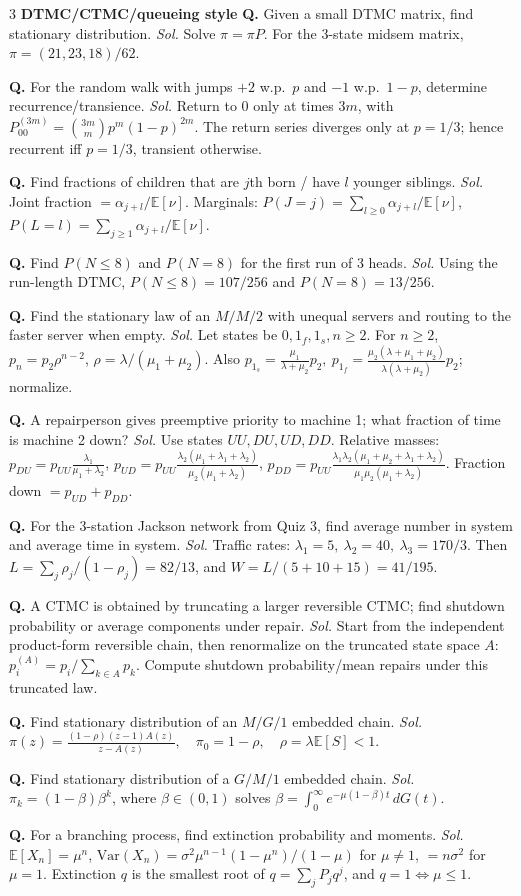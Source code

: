 \documentclass[a4paper,8pt,fleqn]{extarticle}
\newcommand{\E}{\mathbb{E}}
\newcommand{\Var}{\mathrm{Var}}
\newcommand{\1}{\mathbf{1}}
\newcommand{\sub}[1]{\textbf{#1} }
\newcommand{\probq}[2]{\textbf{Q.} #1 \emph{Sol.} #2\par}
\begin{document}
\begin{multicols}{3}
\sub{DTMC/CTMC/queueing style}
\probq{Given a small DTMC matrix, find stationary distribution.}{Solve \(\pi=\pi P\). For the 3-state midsem matrix, \(\pi=(21,23,18)/62\).}
\probq{For the random walk with jumps \(+2\) w.p.\ \(p\) and \(-1\) w.p.\ \(1-p\), determine recurrence/transience.}{Return to \(0\) only at times \(3m\), with \(P_{00}^{(3m)}=\binom{3m}{m}p^m(1-p)^{2m}\). The return series diverges only at \(p=1/3\); hence recurrent iff \(p=1/3\), transient otherwise.}
\probq{Find fractions of children that are \(j\)th born / have \(l\) younger siblings.}{Joint fraction \(=\alpha_{j+l}/\E[\nu]\). Marginals: \(P(J=j)=\sum_{l\ge0}\alpha_{j+l}/\E[\nu]\), \(P(L=l)=\sum_{j\ge1}\alpha_{j+l}/\E[\nu]\).}
\probq{Find \(P(N\le 8)\) and \(P(N=8)\) for the first run of 3 heads.}{Using the run-length DTMC, \(P(N\le8)=107/256\) and \(P(N=8)=13/256\).}
\probq{Find the stationary law of an \(M/M/2\) with unequal servers and routing to the faster server when empty.}{Let states be \(0,1_f,1_s,n\ge2\). For \(n\ge2\), \(p_n=p_2\rho^{n-2}\), \(\rho=\lambda/(\mu_1+\mu_2)\). Also \(p_{1_s}=\frac{\mu_1}{\lambda+\mu_2}p_2,\ p_{1_f}=\frac{\mu_2(\lambda+\mu_1+\mu_2)}{\lambda(\lambda+\mu_2)}p_2\); normalize.}
\probq{A repairperson gives preemptive priority to machine 1; what fraction of time is machine 2 down?}{Use states \(UU,DU,UD,DD\). Relative masses: \(p_{DU}=p_{UU}\frac{\lambda_1}{\mu_1+\lambda_2}\), \(p_{UD}=p_{UU}\frac{\lambda_2(\mu_1+\lambda_1+\lambda_2)}{\mu_2(\mu_1+\lambda_2)}\), \(p_{DD}=p_{UU}\frac{\lambda_1\lambda_2(\mu_1+\mu_2+\lambda_1+\lambda_2)}{\mu_1\mu_2(\mu_1+\lambda_2)}\). Fraction down \(=p_{UD}+p_{DD}\).}
\probq{For the 3-station Jackson network from Quiz 3, find average number in system and average time in system.}{Traffic rates: \(\lambda_1=5,\ \lambda_2=40,\ \lambda_3=170/3\). Then \(L=\sum_j \rho_j/(1-\rho_j)=82/13\), and \(W=L/(5+10+15)=41/195\).}
\probq{A CTMC is obtained by truncating a larger reversible CTMC; find shutdown probability or average components under repair.}{Start from the independent product-form reversible chain, then renormalize on the truncated state space \(A\): \(p_i^{(A)}=p_i/\sum_{k\in A}p_k\). Compute shutdown probability/mean repairs under this truncated law.}
\probq{Find stationary distribution of an \(M/G/1\) embedded chain.}{\(\displaystyle \pi(z)=\frac{(1-\rho)(z-1)A(z)}{z-A(z)},\quad \pi_0=1-\rho,\quad \rho=\lambda\E[S]<1.\)}
\probq{Find stationary distribution of a \(G/M/1\) embedded chain.}{\(\pi_k=(1-\beta)\beta^k\), where \(\beta\in(0,1)\) solves \(\displaystyle \beta=\int_0^\infty e^{-\mu(1-\beta)t}\,dG(t)\).}
\probq{For a branching process, find extinction probability and moments.}{\(\E[X_n]=\mu^n\), \(\Var(X_n)=\sigma^2\mu^{n-1}(1-\mu^n)/(1-\mu)\) for \(\mu\neq1\), \(=n\sigma^2\) for \(\mu=1\). Extinction \(q\) is the smallest root of \(q=\sum_j P_j q^j\), and \(q=1\iff \mu\le1\).}


\end{multicols}
\end{document}
